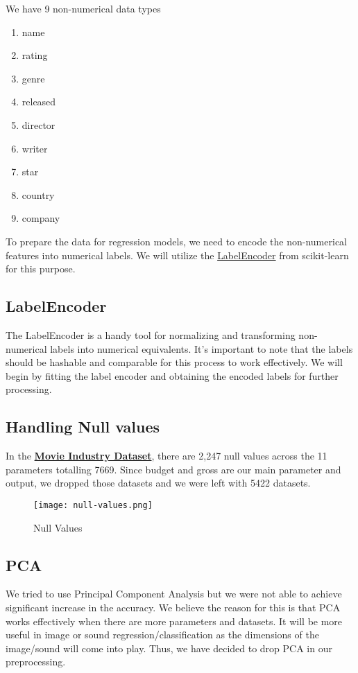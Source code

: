 \documentclass[conference]{IEEEtran}
\begin{document}
        We have 9 non-numerical data types
        \begin{enumerate}
            \item name
            \item rating
            \item genre
            \item released
            \item director
            \item writer
            \item star
            \item country
            \item company
        \end{enumerate}

        To prepare the data for regression models, we need to encode the non-numerical features into numerical labels. We will utilize the \href{https://scikit-learn.org/stable/modules/generated/sklearn.preprocessing.LabelEncoder.html}{LabelEncoder} from scikit-learn for this purpose.

        \subsection*{LabelEncoder}
            The LabelEncoder is a handy tool for normalizing and transforming non-numerical labels into numerical equivalents. It's important to note that the labels should be hashable and comparable for this process to work effectively. We will begin by fitting the label encoder and obtaining the encoded labels for further processing.

        \subsection*{Handling Null values}
            In the \href{https://www.kaggle.com/datasets/danielgrijalvas/movies}{\textbf{Movie Industry Dataset}}, there are 2,247 null values across the 11 parameters totalling 7669.
            Since budget and gross are our main parameter and output, we dropped those datasets and we were left with 5422 datasets.

            \begin{figure}
                \centering \texttt{[image: null-values.png]}
                \caption{Null Values}
                \label{fig:null-values}
            \end{figure}

        \subsection*{PCA}
            We tried to use Principal Component Analysis but we were not able to achieve significant increase in the accuracy.
            We believe the reason for this is that PCA works effectively when there are more parameters and datasets.
            It will be more useful in image or sound regression/classification as the dimensions of the image/sound will come into play.
            Thus, we have decided to drop PCA in our preprocessing.
\end{document}
